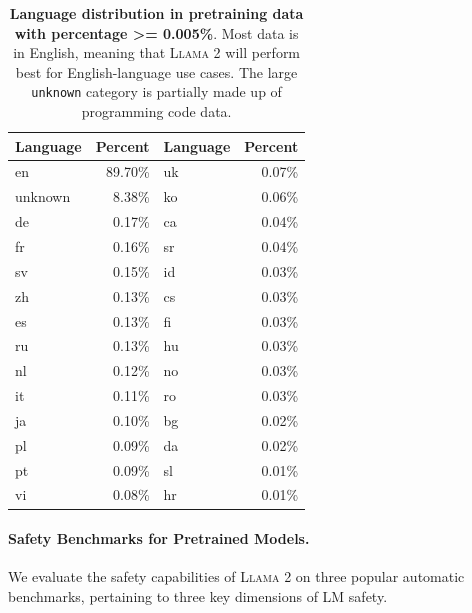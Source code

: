 \documentclass{article}
\newcommand{\cinnamon}{\textsc{Llama 2}\xspace}
\begin{document}
\begin{table}[htbp]
\centering
\begin{tabular}{lr|lr}
\toprule
Language & \multicolumn{1}{l}{Percent} & Language & \multicolumn{1}{l}{Percent} \\
\midrule
en       & 89.70\%                     & uk       & 0.07\%                      \\
unknown  & 8.38\%                      & ko       & 0.06\%                      \\
de       & 0.17\%                      & ca       & 0.04\%                      \\
fr       & 0.16\%                      & sr       & 0.04\%                      \\
sv       & 0.15\%                      & id       & 0.03\%                      \\
zh       & 0.13\%                      & cs       & 0.03\%                      \\
es       & 0.13\%                      & fi       & 0.03\%                      \\
ru       & 0.13\%                      & hu       & 0.03\%                      \\
nl       & 0.12\%                      & no       & 0.03\%                      \\
it       & 0.11\%                      & ro       & 0.03\%                      \\
ja       & 0.10\%                      & bg       & 0.02\%                      \\
pl       & 0.09\%                      & da       & 0.02\%                      \\
pt       & 0.09\%                      & sl       & 0.01\%                      \\
vi       & 0.08\%                      & hr       & 0.01\%   \\
\bottomrule
\end{tabular}
\caption{\textbf{Language distribution in pretraining data with percentage \textgreater{}= 0.005\%}. Most data is in English, meaning that \cinnamon{} will perform best for English-language use cases. The large \texttt{unknown} category is partially made up of programming code data.
}
\label{tab:lid}
\end{table}

\paragraph{Safety Benchmarks for Pretrained Models.} 
\label{sec:safety_pretrain_bench}
We evaluate the safety capabilities of \cinnamon on three popular automatic benchmarks, pertaining to three key dimensions of LM safety.
\end{document}
